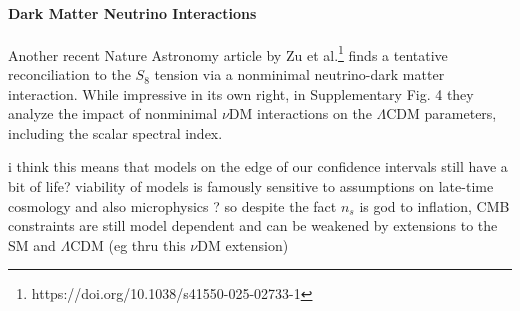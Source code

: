 \paragraph{Dark Matter Neutrino Interactions}

Another recent Nature Astronomy article by Zu et al.\footnote{https://doi.org/10.1038/s41550-025-02733-1} finds a tentative reconciliation to the $S_8$ tension via a nonminimal neutrino-dark matter interaction. While impressive in its own right, in Supplementary Fig. 4 they analyze the impact of nonminimal $\nu$DM interactions on the $\Lambda$CDM parameters, including the scalar spectral index. 


 i think this means that models on the edge of our confidence intervals still have a bit of life? viability of models is famously sensitive to assumptions on late-time cosmology and also microphysics ? so despite the fact $n_s$ is god to inflation, CMB constraints are still model dependent and can be weakened by extensions to the SM and $\Lambda$CDM (eg thru this $\nu$DM extension)
